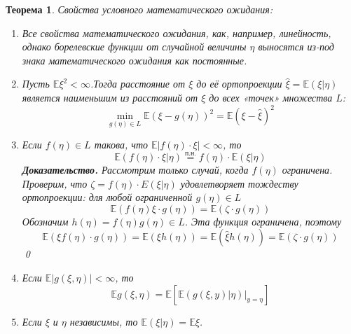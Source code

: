 \documentclass[oneside,final,14pt]{extreport}
\renewenvironment{proof}{{\bfseries Доказательство.}}{\qed}
\newtheorem{thm}{Теорема}[section]
\theoremstyle{definition}
\begin{document}
\begin{thm}
    Свойства условного математического ожидания:
    \begin{enumerate}
        \item Все свойства математического ожидания, как, например, линейность, однако борелевские функции от случайной величины $\eta$ выносятся из-под знака математического ожидания как постоянные.
        \item Пусть $\mathbb{E} \xi^{2}<\infty$.Тогда расстояние от $\xi$ до её ортопроекции $\widehat{\xi}=\mathbb{E}(\xi | \eta)$ является наименьшим из расстояний от $\xi$ до всех «точек» множества $L$:
        \begin{equation*}
            \min_{g(\eta) \in L} \mathbb{E}(\xi-g(\eta))^{2}=\mathbb{E}(\xi-\widehat{\xi})^{2}
        \end{equation*}
        \item Если $f(\eta) \in L$ такова, что $\mathbb{E}|f(\eta) \cdot \xi|<\infty$, то
        \begin{equation*}
            \mathbb{E}(f(\eta) \cdot \xi | \eta)
            \stackrel{\text{п.н.}}{=}
            f(\eta) \cdot \mathbb{E}(\xi | \eta)
        \end{equation*}
        \begin{proof}
            Рассмотрим только случай, когда $f(\eta)$ ограничена. Проверим, что $\zeta=f(\eta) \cdot E(\xi | \eta)$ удовлетворяет тождеству ортопроекции: для любой ограниченной $g(\eta) \in L$
            \begin{equation*}
                \mathbb{E}(f(\eta) \xi \cdot g(\eta))=\mathbb{E}(\zeta \cdot g(\eta))
            \end{equation*}
            Обозначим $h(\eta)=f(\eta) g(\eta) \in L$. Эта функция ограничена, поэтому
            \begin{equation*}
                \mathbb{E}(\xi f(\eta) \cdot g(\eta))=\mathbb{E}(\xi h(\eta))=\mathbb{E}(\widehat{\xi} h(\eta))=\mathbb{E}(\zeta \cdot g(\eta))
            \end{equation*}
        \end{proof}
        \item Если $\mathbb{E}|g(\xi, \eta)|<\infty$, то
        \begin{equation*}
            \mathbb{E} g(\xi, \eta)=\mathbb{E}\left[\left.\mathbb{E}(g(\xi, y) | \eta)\right|_{y=\eta}\right]
        \end{equation*}
        \item Если $\xi$ и $\eta$ независимы, то $\mathbb{E}(\xi | \eta)=\mathbb{E} \xi$.
    \end{enumerate}
\end{thm}
\end{document}
